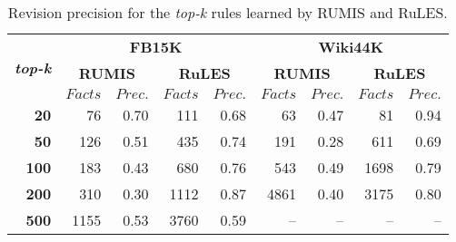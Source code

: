 \begin{table}[t]
\centering
\begin{tabular}{|r|r r|r r|r r|r r|}
 \hline
 \multirow{3}{*}{\textbf{\textit{top-k}}}&\multicolumn{4}{|c|}{\textbf{FB15K}} & \multicolumn{4}{|c|}{\textbf{Wiki44K}}\\
 \cline{2-9}&\multicolumn{2}{|c|}{\textbf{RUMIS}}&\multicolumn{2}{|c|}{\textbf{RuLES}}&\multicolumn{2}{|c|}{\textbf{RUMIS}}&\multicolumn{2}{|c|}{\textbf{RuLES}} \\
 & $Facts$ & $Prec.$ & $Facts$ & $Prec.$& $Facts$ & $Prec.$& $Facts$ & $Prec.$ \\
 \hline
\textbf{20} & 76 & 0.70 & 111 & 0.68 & 63 & 0.47 & 81 & 0.94 \\
\textbf{50} & 126 & 0.51 & 435 & 0.74 & 191 & 0.28 & 611 & 0.69 \\
\textbf{100} & 183 & 0.43 & 680 & 0.76 & 543 & 0.49 & 1698 & 0.79 \\
\textbf{200} & 310 & 0.30 & 1112 & 0.87 & 4861 & 0.40 & 3175 & 0.80 \\
\textbf{500} & 1155 & 0.53 & 3760 & 0.59 & -- & -- & -- & -- \\
\hline
\end{tabular}
\caption{Revision precision for the \textit{top-k} rules learned by RUMIS and RuLES.}
\label{table:exception_revision_result}
\end{table}